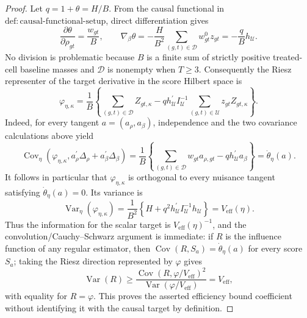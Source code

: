 \documentclass{article}
\begin{document}
\begin{proof}
Let \(q=1+\theta=H/B\).  From the causal functional in
\(\mathrm{def{:}causal\text{-}functional\text{-}setup}\), direct
differentiation gives
\[
 \frac{\partial\theta}{\partial\rho_{gt}}=\frac{w_{gt}}{B},
 \qquad
 \nabla_{\beta}\theta
   =-\frac{H}{B^2}\sum_{(g,t)\in\mathcal D}w^0_{gt}z_{gt}
   =-\frac{q}{B}h_{\mathcal U}.
\]
No division is problematic because \(B\) is a finite sum of strictly
positive treated-cell baseline masses and \(\mathcal D\) is nonempty when
\(T\geq3\).  Consequently the Riesz representer of the target derivative in
the score Hilbert space is
\[
 \varphi_{\eta,\kappa}
 =\frac{1}{B}\left\{
      \sum_{(g,t)\in\mathcal D}Z_{gt,\kappa}
      -q h_{\mathcal U}^{\prime}I_{\mathcal U}^{-1}
          \sum_{(g,t)\in\mathcal U}z_{gt}Z_{gt,\kappa}
   \right\}.
\]
Indeed, for every tangent \(a=(a_{\rho},a_{\beta})\), independence and the
two covariance calculations above yield
\[
 \operatorname{Cov}_{\eta}\!\left(
   \varphi_{\eta,\kappa},
   a_{\rho}^{\prime}\Delta_{\rho}+a_{\beta}^{\prime}\Delta_{\beta}
 \right)
 =\frac{1}{B}\left\{
    \sum_{(g,t)\in\mathcal D}w_{gt}a_{\rho,gt}
       -q h_{\mathcal U}^{\prime}a_{\beta}
  \right\}
 =\dot\theta_{\eta}(a).
\]
It follows in particular that \(\varphi_{\eta,\kappa}\) is orthogonal to
every nuisance tangent satisfying \(\dot\theta_{\eta}(a)=0\).  Its variance
is
\[
 \operatorname{Var}_{\eta}(\varphi_{\eta,\kappa})
 =\frac{1}{B^2}\left\{
      H+q^2h_{\mathcal U}^{\prime}I_{\mathcal U}^{-1}h_{\mathcal U}
   \right\}
 =V_{\mathrm{eff}}(\eta).
\]
Thus the information for the scalar target is
\(V_{\mathrm{eff}}(\eta)^{-1}\), and the convolution/Cauchy--Schwarz
argument is immediate: if \(R\) is the influence function of any regular
estimator, then
\(\operatorname{Cov}(R,S_a)=\dot\theta_{\eta}(a)\) for every score
\(S_a\); taking the Riesz direction represented by \(\varphi\) gives
\[
 \operatorname{Var}(R)\geq
 \frac{\operatorname{Cov}(R,\varphi/V_{\mathrm{eff}})^2}
      {\operatorname{Var}(\varphi/V_{\mathrm{eff}})}
 =V_{\mathrm{eff}},
\]
with equality for \(R=\varphi\).  This proves the asserted efficiency
bound coefficient without identifying it with the causal target by
definition.


\end{proof}
\end{document}
